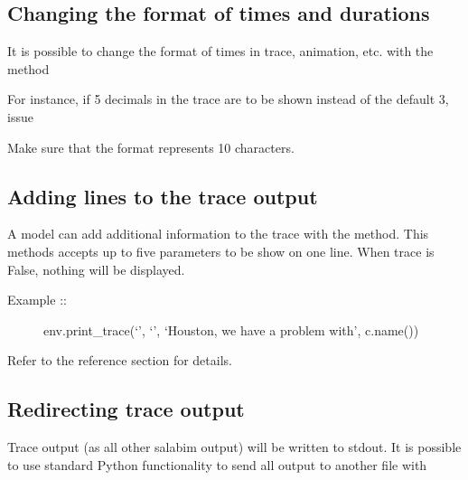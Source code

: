 \documentclass[letterpaper,10pt,english]{sphinxmanual}
\begin{document}
\subsection{Changing the format of times and durations}
\label{\detokenize{Miscellaneous:changing-the-format-of-times-and-durations}}
It is possible to change the format of times in trace, animation, etc. with the method  

For instance, if 5 decimals in the trace are to be shown instead of the default 3, issue

%
\begin{sphinxVerbatim}[commandchars=\\\{\}]
\end{sphinxVerbatim}

Make sure that the format represents 10 characters.


\subsection{Adding lines to the trace output}
\label{\detokenize{Miscellaneous:adding-lines-to-the-trace-output}}
A model can add additional information to the trace with the  method. This methods accepts up to five parameters to be show on one line. When trace is False, nothing will be displayed.
\begin{description}
\item[{Example ::}] \leavevmode
env.print\_trace(‘’, ‘’, ‘Houston, we have a problem with’, c.name())

\end{description}

Refer to the reference section for details.


\subsection{Redirecting trace output}
\label{\detokenize{Miscellaneous:redirecting-trace-output}}
Trace output (as all other salabim output) will be written to stdout. It is possible to use standard Python functionality to send all output to another file with

%
\begin{sphinxVerbatim}[commandchars=\\\{\}]
  
   
\end{sphinxVerbatim}
\end{document}

